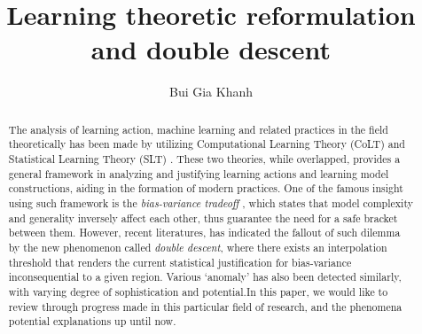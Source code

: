 \documentclass[
  journal=largetwo,
  year=2025,
  volume=37,
]{cup-journal}
\title{Learning theoretic reformulation and double descent}
\author{Bui Gia Khanh}
\affiliation{Department of Physics, Hanoi University of Science, Vietnam National University, Hanoi Vietnam}
\begin{document}
\begin{abstract}
    The analysis of learning action, machine learning and related practices in the field theoretically has been made by utilizing Computational Learning Theory (CoLT) \cite{10.1145/1968.1972} and Statistical Learning Theory (SLT) \cite{Vapnik1999-VAPTNO}. These two theories, while overlapped, provides a general framework in analyzing and justifying learning actions and learning model constructions, aiding in the formation of modern practices. One of the famous insight using such framework is the \textit{bias-variance tradeoff} \cite{6797087}, which states that model complexity and generality inversely affect each other, thus guarantee the need for a safe bracket between them. However, recent literatures, \cite{belkin_reconciling_2019} has indicated the fallout of such dilemma by the new phenomenon called \textit{double descent}, where there exists an interpolation threshold that renders the current statistical justification for bias-variance inconsequential to a given region. Various `anomaly' has also been detected similarly, with varying degree of sophistication and potential.In this paper, we would like to review through progress made in this particular field of research, and the phenomena potential explanations up until now. 
\end{abstract}
\end{document}
